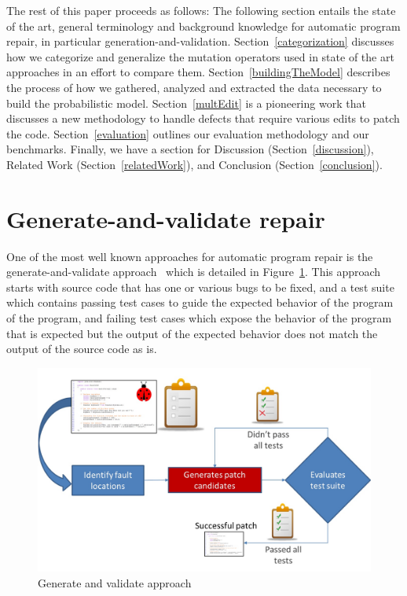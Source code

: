 \documentclass[conference]{IEEEtran}
\begin{document}
The rest of this paper proceeds as follows:
The following section entails the state of the art, general terminology and
background knowledge for automatic program repair, in particular
generation-and-validation. Section~\ref{categorization} discusses how we
categorize and generalize the mutation operators used in state of the art
approaches in an effort to compare them. Section~\ref{buildingTheModel}
describes the process of how we gathered, analyzed and extracted the data
necessary to build the probabilistic model. Section~\ref{multEdit} is a
pioneering work that discusses a new methodology to handle defects that require
various edits to patch the code. Section~\ref{evaluation} outlines our
evaluation methodology and our benchmarks.  Finally, we have a section for
Discussion (Section~\ref{discussion}), Related Work (Section~\ref{relatedWork}), and Conclusion (Section~\ref{conclusion}).

\section{Generate-and-validate repair} \label{background}

One of the most well known approaches for automatic program repair is the
generate-and-validate approach~\cite{legoues12} which is detailed in Figure~\ref{fig:generateandvalidate}. This approach starts with source code that
has one or various bugs to be fixed, and a test suite which contains passing
test cases to guide the expected behavior of the program of the program, and failing test 
cases which expose the behavior of the program that is expected but the output
of the expected behavior does not match the output of the source code as is.

\begin{figure}[!h]
  \centering
    \includegraphics[scale=0.25]{Picture1}
  \caption{Generate and validate approach}
  \label{fig:generateandvalidate}
\end{figure}
\end{document}
